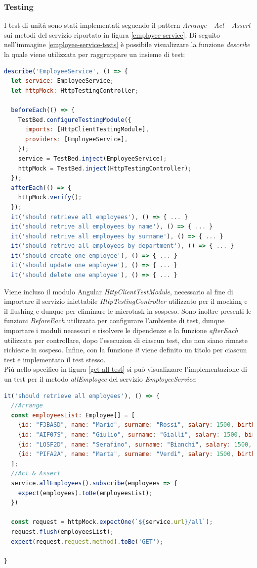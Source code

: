 \subsubsection*{Testing}
I test di unità sono stati implementati seguendo il pattern \textit{Arrange - Act - Assert} sui metodi del servizio riportato in figura \ref{employee-service}. Di seguito nell'immagine \ref{employee-service-tests} è possibile visualizzare la funzione \textit{describe} la quale viene utilizzata per raggruppare un insieme di test:
\begin{lstlisting}[language=JavaScript]
describe('EmployeeService', () => {
  let service: EmployeeService;
  let httpMock: HttpTestingController;

  beforeEach(() => {
    TestBed.configureTestingModule({
      imports: [HttpClientTestingModule],
      providers: [EmployeeService],
    });
    service = TestBed.inject(EmployeeService);
    httpMock = TestBed.inject(HttpTestingController);
  });
  afterEach(() => {
    httpMock.verify();
  });
  it('should retrieve all employees'), () => { ... }
  it('should retrive all employees by name'), () => { ... }
  it('should retrive all employees by surname'), () => { ... }
  it('should retrive all employees by department'), () => { ... }
  it('should create one employee'), () => { ... }
  it('should update one employee'), () => { ... }
  it('should delete one employee'), () => { ... }
\end{lstlisting}
Viene incluso il modulo Angular \textit{HttpClientTestModule}, necessario al fine di importare il servizio iniettabile \textit{HttpTestingController} utilizzato per il mocking e il flushing e dunque per eliminare le microtask in sospeso. Sono inoltre presenti le funzioni \textit{BeforeEach} utilizzata per configurare l'ambiente di test, dunque importare i moduli necessari e risolvere le dipendenze e la funzione \textit{afterEach} utilizzata per controllare, dopo l'esecuzion di ciascun test, che non siano rimaste richieste in sospeso. Infine, con la funzione \textit{it} viene definito un titolo per ciascun test e implementato il test stesso.\\
Più nello specifico in figura \ref{get-all-test} si può visualizzare l'implementazione di un test per il metodo \textit{allEmployee} del servizio \textit{EmployeeService}:
\begin{lstlisting}[language=JavaScript]
it('should retrieve all employees'), () => {
  //Arrange
  const employeesList: Employee[] = [
    {id: "F3BASD", name: "Mario", surname: "Rossi", salary: 1500, birth: new Date("05/04/1999")},
    {id: "AIF07S", name: "Giulio", surname: "Gialli", salary: 1500, birth: new Date("02/01/1988")},
    {id: "LOSF2D", name: "Serafino", surname: "Bianchi", salary: 1500, birth: new Date("22/11/1979")},
    {id: "PIFA2A", name: "Marta", surname: "Verdi", salary: 1500, birth: new Date("30/01/1995")},
  ];
  //Act & Assert
  service.allEmployees().subscribe(employees => {
    expect(employees).toBe(employeesList);
  })

  const request = httpMock.expectOne(`${service.url}/all`);
  request.flush(employeesList);
  expect(request.request.method).toBe('GET');

}
\end{lstlisting}
